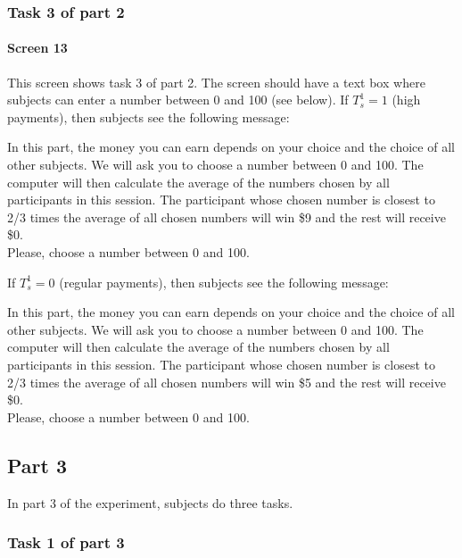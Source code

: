 \documentclass[11pt]{article}
\begin{document}
\subsubsection{Task 3 of part 2}

\paragraph{Screen 13} This screen shows task 3 of part 2. The screen should have a text box where subjects can enter a number between 0 and 100 (see below). If $T_s^1=1$ (high payments), then subjects see the following message:

\begin{tcolorbox}
In this part, the money you can earn depends on your choice and the choice of all other subjects. We will ask you to choose a number between 0 and 100. The computer will then calculate the average of the numbers chosen by all participants in this session. The participant whose chosen number is closest to 2/3 times the average of all chosen numbers will win \$9 and the rest will receive \$0.\\

Please, choose a number between 0 and 100.
\end{tcolorbox}

If $T_s^1=0$ (regular payments), then subjects see the following message:

\begin{tcolorbox}
In this part, the money you can earn depends on your choice and the choice of all other subjects. We will ask you to choose a number between 0 and 100. The computer will then calculate the average of the numbers chosen by all participants in this session. The participant whose chosen number is closest to 2/3 times the average of all chosen numbers will win \$5 and the rest will receive \$0.\\

Please, choose a number between 0 and 100.
\end{tcolorbox}

\subsection{Part 3}

In part 3 of the experiment, subjects do three tasks.

\subsubsection{Task 1 of part 3}
\end{document}
